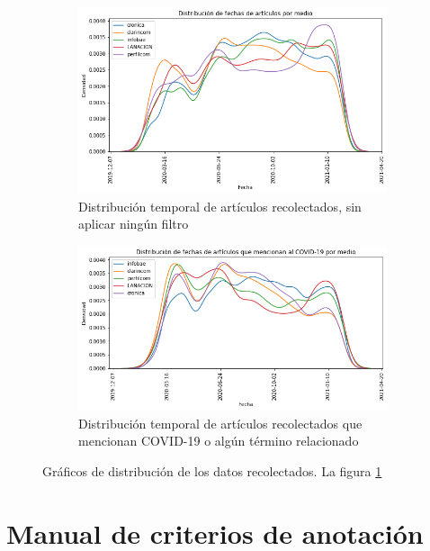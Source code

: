 \begin{figure}
    \centering
    \begin{subfigure}[t]{\textwidth}
        \includegraphics[width=\textwidth]{img/fechas_por_medios_todas.png}
        \caption{Distribución temporal de artículos recolectados, sin aplicar ningún filtro}
        \label{fig:fecha_articulos_por_medio_todas}
    \end{subfigure}

    \begin{subfigure}[t]{\textwidth}
        \includegraphics[width=\textwidth]{img/fechas_por_medios.png}
        \caption{Distribución temporal de artículos recolectados que mencionan COVID-19 o algún término relacionado}
        \label{fig:fecha_articulos_por_medio_covid}
    \end{subfigure}

    \caption{Gráficos de distribución de los datos recolectados. La figura \ref{fig:fecha_articulos_por_medio_todas}}
\end{figure}


\section{Manual de criterios de anotación}
\label{app:manual_criterios_anotacion}
